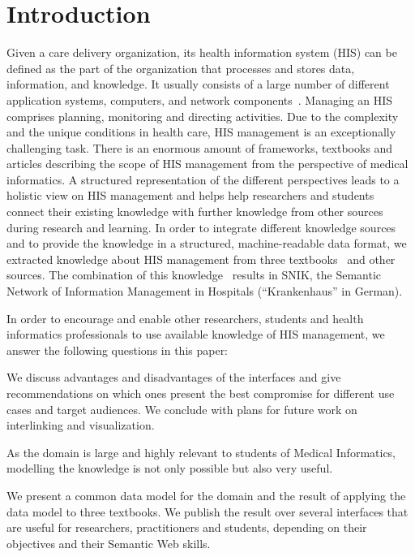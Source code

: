 \documentclass[sw]{iosart2x}
\renewcommand{\citep}{\cite}%
\begin{document}
\section{Introduction}
Given a care delivery organization, its health information system (HIS) can be defined as the part of the organization that processes and stores data, information, and knowledge.
It usually consists of a large number of different application systems, computers, and network components~\citep{bb}.
Managing an HIS comprises planning, monitoring and directing activities.
Due to the complexity and the unique conditions in health care, HIS management is an exceptionally challenging task.
There is an enormous amount of frameworks, textbooks and articles describing the scope of HIS management from the perspective of medical informatics.
A structured representation of the different perspectives leads to a holistic view on HIS management and helps help researchers and students connect their existing knowledge with further knowledge from other sources during research and learning.
In order to integrate different knowledge sources and to provide the knowledge in a structured, machine-readable data format, we extracted knowledge about HIS management from three textbooks~\citep{bb,ob,he} and other sources.
The combination of this knowledge~\citep{einsemantischesnetz,domaene,approachtosupport} results in SNIK, the Semantic Network of Information Management in Hospitals (\enquote{Krankenhaus} in German).

In order to encourage and enable other researchers, students and health informatics professionals to use available knowledge of HIS management, we answer the following questions in this paper:

We discuss advantages and disadvantages of the interfaces and give recommendations on which ones present the best compromise for different use cases and target audiences.
We conclude with plans for future work on interlinking and visualization.

As the domain is large and highly relevant to students of Medical Informatics, modelling the knowledge is not only possible but also very useful.

We present a common data model for the domain and the result of applying the data model to three textbooks.
We publish the result over several interfaces that are useful for researchers, practitioners and students, depending on their objectives and their Semantic Web skills.
\end{document}
